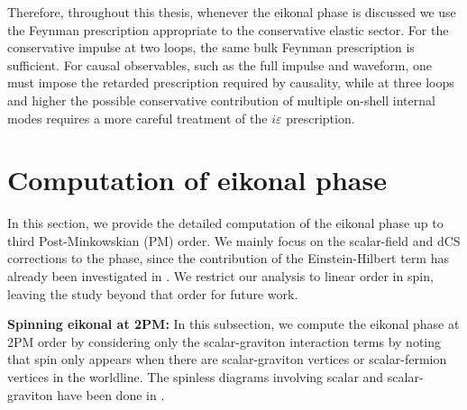 {Therefore, throughout this thesis, whenever the eikonal phase is discussed we use the Feynman prescription appropriate to the conservative elastic sector. For the conservative impulse at two loops, the same bulk Feynman prescription is sufficient. For causal observables, such as the full impulse and waveform, one must impose the retarded prescription required by causality, while at three loops and higher the possible conservative contribution of multiple on-shell internal modes requires a more careful treatment of the \(i\varepsilon\) prescription.
}
\section{Computation of eikonal phase}
\label{ch3:sec4}
In this section, we provide the detailed computation of the eikonal phase up to third Post-Minkowskian (PM) order. We mainly focus on the scalar-field and dCS corrections to the phase, since the contribution of the Einstein-Hilbert term has already been investigated in \cite{Jakobsen:2022fcj, Jakobsen:2021zvh}. We restrict our analysis to linear order in spin, leaving the study beyond that order for future work.

\textbf{Spinning eikonal at 2PM:}
In this subsection, we compute the eikonal phase at 2PM order by considering only the scalar-graviton interaction terms by noting that spin only appears when there are scalar-graviton vertices or scalar-fermion vertices in the worldline. The spinless diagrams involving scalar and scalar-graviton have been done in \cite{Bhattacharyya:2024aeq}.\\

